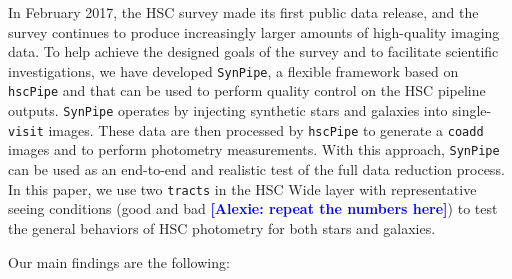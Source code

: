 \documentclass[useamsfonts]{pasj01}
\newcommand{\alexie}[1]{\textcolor{blue}{\textbf{[Alexie: #1]}}}
\def\hscpipe{\texttt{hscPipe}}
\def\synpipe{\texttt{SynPipe}}
\def\coadd{\texttt{coadd}}
\def\visit{\texttt{visit}}
\def\tracts{\texttt{tracts}}
\begin{document}
    In February 2017, the HSC survey made its first public data release, and the survey 
    continues to produce increasingly larger amounts of high-quality imaging data.
    To help achieve the designed goals of the survey and to facilitate scientific investigations, we have developed \synpipe{}, a flexible framework based on
    \hscpipe{} and that can be used to perform quality control on the 
    HSC pipeline outputs. \synpipe{} operates by injecting synthetic stars and galaxies into single-\visit{} images. 
    These data are then processed by \hscpipe{} to generate a \coadd{} images and to perform photometry measurements. With this  approach,  \synpipe{} can be used as an end-to-end and realistic test of the full  data reduction process. In this paper, we  use  two \tracts{} in the HSC Wide layer with
    representative seeing conditions (good and bad \alexie{repeat the numbers here}) to test the general behaviors of HSC
    photometry for both stars and galaxies.

    Our main findings are the following:
\end{document}
